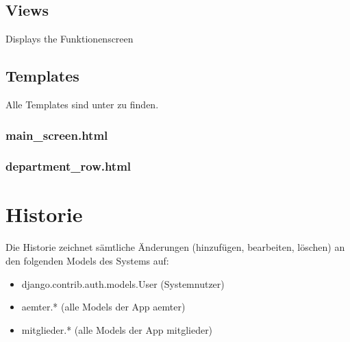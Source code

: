\documentclass[letterpaper,10pt,english]{sphinxmanual}
\begin{document}
\subsection{Views}
\label{\detokenize{masterCodeDoc:id1}}\label{\detokenize{masterCodeDoc:module-aemter.views}}

\begin{fulllineitems}
\label{\detokenize{masterCodeDoc:aemter.views.main_screen}}
Displays the Funktionen\sphinxhyphen{}screen

\end{fulllineitems}



\subsection{Templates}
\label{\detokenize{masterCodeDoc:id2}}
Alle Templates sind unter  zu finden.


\subsubsection{main\_screen.html}
\label{\detokenize{masterCodeDoc:main-screen-html}}

\subsubsection{department\_row.html}
\label{\detokenize{masterCodeDoc:department-row-html}}

\section{Historie}
\label{\detokenize{masterCodeDoc:historie}}
Die Historie zeichnet sämtliche Änderungen (hinzufügen, bearbeiten, löschen) an den folgenden Models des Systems auf:
\begin{itemize}
\item {} 
django.contrib.auth.models.User (Systemnutzer)

\item {} 
aemter.* (alle Models der App aemter)

\item {} 
mitglieder.* (alle Models der App mitglieder)

\end{itemize}
\end{document}
